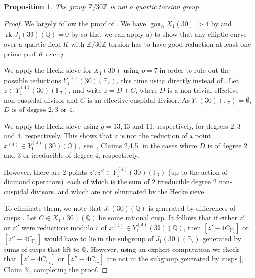 \documentclass[11pt,reqno]{amsart}
\DeclareMathOperator{\rk}{rk}
\DeclareMathOperator{\gon}{gon}
\newtheorem{proposition}[theorem]{Proposition}
\theoremstyle{definition}
\numberwithin{equation}{section}
\newcommand{\Q}{\mathbb{Q}}
\newcommand{\F}{\mathbb{F}}
\def\torz#1{\mathbb Z /#1 \mathbb Z}
\newcommand{\githubbare}[1]{\href{https://github.com/nt-lib/quartic-torsion/blob/main/#1}{\path{#1}}}
\newcommand{\github}[2]{[\githubbare{#1}, #2]}
\begin{document}
\begin{proposition} \label{prop:30}
    The group $\torz{30}$ is not a quartic torsion group. 
\end{proposition}
\begin{proof}We largely follow the proof of .  We have $\gon_\Q X_1(30)$ $>4$ by \cite[Theorem 2.6]{JeonKimPark06} and $\rk J_1(30)(\Q)=0$ by \cite[Theorem 3.1]{Deg3Class} so that we can apply  a) to show that any elliptic curve over a quartic field $K$ with $\torz{30}$ torsion has to have good reduction at least one prime $\wp$ of $K$ over $p$.

    We apply the Hecke sieve for $X_1(30)$ using $p=7$ in order to rule out the possible reductions $Y_1^{(4)}(30)(\F_7)$, this time using  directly instead of . Let  $z\in Y_1^{(4)}(30)(\F_7)$, and write $z=D+C$, where $D$ is a non-trivial effective non-cuspidal divisor and $C$ is an effective cuspidal divisor. As $Y_1(30)(\F_7)=\emptyset$, $D$ is of degree $2,3$ or $4$.

    We apply the Hecke sieve using $q=13, 13$ and $11$, respectively, for degrees $2, 3$ and $4$, respectively. This shows that $z$
    is not the reduction of a point $x^{(4)}\in Y_1^{(4)}(30)(\Q),$ see \github{X1_30.m}{Claims 2,4,5} in the cases where $D$ is of degree $2$ and $3$ or irreducible of degree $4$, respectively.
    

    However, there are 2 points $z',z''\in Y_1^{(4)}(30)(\F_7)$ (up to the action of diamond operators), each of which is the sum of 2 irreducible degree $2$ non-cuspidal divisors, and which are not eliminated by the Hecke sieve. 

    To eliminate them, we note that $J_1(30)(\Q)$ is generated by differences of cusps \cite[Corollary 4.14]{Deg3Class}. Let $C\in X_1(30)(\Q)$ be some rational cusp. It follows that if either $z'$ or $z''$ were reductions modulo $7$ of $x^{(4)}\in Y_1^{(4)}(30)(\Q)$, then $[z'-4C_{\F_7}]$ or $[z''-4C_{\F_7}]$ would have to lie in the subgroup of $J_1(30)(\F_7)$ generated by sums of cusps that lift to $\Q$. However, using an explicit computation we check that $[z'-4C_{\F_7}]$ or $[z''-4C_{\F_7}]$ are not in the subgroup generated by cusps \github{X1_30.m}{Claim 3}, completing the proof.
\end{proof}
\end{document}
